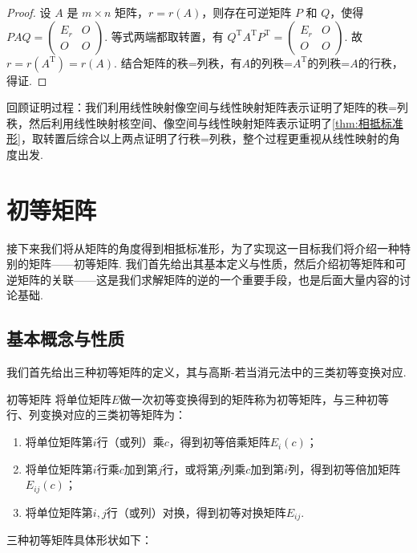 \begin{proof} \label{pf:11:矩阵行秩=列秩}
    设 $A$ 是 $m \times n$ 矩阵，$r = r(A)$，则存在可逆矩阵 $P$ 和 $Q$，使得 $PAQ = \begin{pmatrix}
        E_r & O \\ O & O
    \end{pmatrix}$. 等式两端都取转置，有 $Q^\mathrm{T}A^\mathrm{T}P^\mathrm{T} = \begin{pmatrix}
            E_r & O \\ O & O
    \end{pmatrix}$. 故 $r = r(A^\mathrm{T}) = r(A)$. 结合矩阵的秩=列秩，有$A$的列秩=$A^\mathrm{T}$的列秩=$A$的行秩，得证.
\end{proof}

回顾证明过程：我们利用线性映射像空间与线性映射矩阵表示证明了矩阵的秩=列秩，然后利用线性映射核空间、像空间与线性映射矩阵表示证明了\autoref{thm:相抵标准形}，取转置后综合以上两点证明了行秩=列秩，整个过程更重视从线性映射的角度出发.

\section{初等矩阵}

接下来我们将从矩阵的角度得到相抵标准形，为了实现这一目标我们将介绍一种特别的矩阵——初等矩阵. 我们首先给出其基本定义与性质，然后介绍初等矩阵和可逆矩阵的关联——这是我们求解矩阵的逆的一个重要手段，也是后面大量内容的讨论基础.

\subsection{基本概念与性质}

我们首先给出三种初等矩阵的定义，其与高斯-若当消元法中的三类初等变换对应.
\begin{definition}{}{初等矩阵}
    将单位矩阵$E$做一次初等变换得到的矩阵称为初等矩阵，与三种初等行、列变换对应的三类初等矩阵为：
    \begin{enumerate}
        \item 将单位矩阵第$i$行（或列）乘$c$，得到初等倍乘矩阵$E_i(c)$；

        \item 将单位矩阵第$i$行乘$c$加到第$j$行，或将第$j$列乘$c$加到第$i$列，得到初等倍加矩阵$E_{ij}(c)$；

        \item 将单位矩阵第$i,j$行（或列）对换，得到初等对换矩阵$E_{ij}$.
    \end{enumerate}
\end{definition}
三种初等矩阵具体形状如下：

